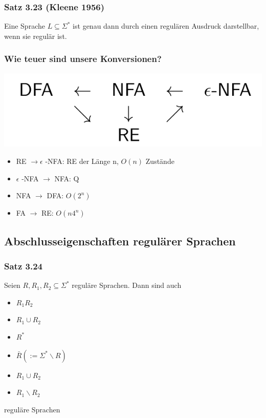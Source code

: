 \documentclass[11pt]{article}
\begin{document}
\subsubsection{Satz 3.23 (Kleene 1956)}
\label{sec:orge3c8e63}
Eine Sprache \(L \subseteq \Sigma^*\) ist genau dann durch einen regulären Ausdruck darstellbar, wenn sie regulär ist.

\subsubsection{Wie teuer sind unsere Konversionen?}
\label{sec:orgdd5e11e}
\begin{center}
\includegraphics[width=.9\linewidth]{./img/2-kapitel/konversionen.png}
\end{center}
\begin{itemize}
\item RE \(\rightarrow \epsilon\) -NFA: RE der Länge n, \(O(n)\) Zustände
\item \(\epsilon\) -NFA \(\rightarrow\) NFA: Q
\item NFA \(\rightarrow\) DFA: \(O(2^n)\)
\item FA \(\rightarrow\) RE: \(O(n4^n)\)
\end{itemize}

\subsection{Abschlusseigenschaften regulärer Sprachen}
\label{sec:org716196e}
\subsubsection{Satz 3.24}
\label{sec:orgc45cf35}
Seien \(R,R_1, R_2 \subseteq \Sigma^*\) reguläre Sprachen. Dann sind auch
\begin{itemize}
\item \(R_1R_2\)
\item \(R_1 \cup R_2\)
\item \(R^*\)
\item \(\bar{R} (:= \Sigma^* \backslash R)\)
\item \(R_1 \cup R_2\)
\item \(R_1 \backslash R_2\) \\
\end{itemize}
reguläre Sprachen
\end{document}
